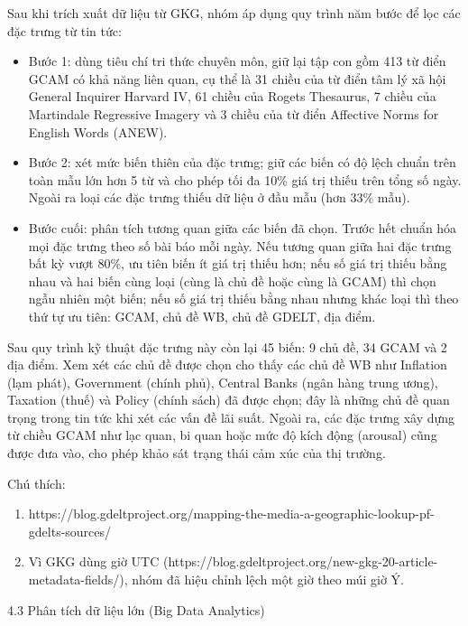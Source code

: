 Sau khi trích xuất dữ liệu từ GKG, nhóm áp dụng quy trình năm bước để lọc các đặc trưng từ tin tức:

\begin{itemize}
\item
  Bước 1: dùng tiêu chí tri thức chuyên môn, giữ lại tập con gồm 413 từ điển GCAM có khả năng liên quan, cụ thể là 31 chiều của từ điển tâm lý xã hội General Inquirer Harvard IV, 61 chiều của Roget\textquotesingle s Thesaurus, 7 chiều của Martindale Regressive Imagery và 3 chiều của từ điển Affective Norms for English Words (ANEW).
\item
  Bước 2: xét mức biến thiên của đặc trưng; giữ các biến có độ lệch chuẩn trên toàn mẫu lớn hơn 5 từ và cho phép tối đa 10\% giá trị thiếu trên tổng số ngày. Ngoài ra loại các đặc trưng thiếu dữ liệu ở đầu mẫu (hơn 33\% mẫu).
\item
  Bước cuối: phân tích tương quan giữa các biến đã chọn. Trước hết chuẩn hóa mọi đặc trưng theo số bài báo mỗi ngày. Nếu tương quan giữa hai đặc trưng bất kỳ vượt 80\%, ưu tiên biến ít giá trị thiếu hơn; nếu số giá trị thiếu bằng nhau và hai biến cùng loại (cùng là chủ đề hoặc cùng là GCAM) thì chọn ngẫu nhiên một biến; nếu số giá trị thiếu bằng nhau nhưng khác loại thì theo thứ tự ưu tiên: GCAM, chủ đề WB, chủ đề GDELT, địa điểm.
\end{itemize}

Sau quy trình kỹ thuật đặc trưng này còn lại 45 biến: 9 chủ đề, 34 GCAM và 2 địa điểm. Xem xét các chủ đề được chọn cho thấy các chủ đề WB như Inflation (lạm phát), Government (chính phủ), Central Banks (ngân hàng trung ương), Taxation (thuế) và Policy (chính sách) đã được chọn; đây là những chủ đề quan trọng trong tin tức khi xét các vấn đề lãi suất. Ngoài ra, các đặc trưng xây dựng từ chiều GCAM như lạc quan, bi quan hoặc mức độ kích động (arousal) cũng được đưa vào, cho phép khảo sát trạng thái cảm xúc của thị trường.

Chú thích:

\begin{enumerate}
\def\labelenumi{\arabic{enumi}.}
\setcounter{enumi}{9}
\item
  https://blog.gdeltproject.org/mapping-the-media-a-geographic-lookup-pf-gdelts-sources/
\item
  Vì GKG dùng giờ UTC (https://blog.gdeltproject.org/new-gkg-20-article-metadata-fields/), nhóm đã hiệu chỉnh lệch một giờ theo múi giờ Ý.
\end{enumerate}

4.3 Phân tích dữ liệu lớn (Big Data Analytics)

